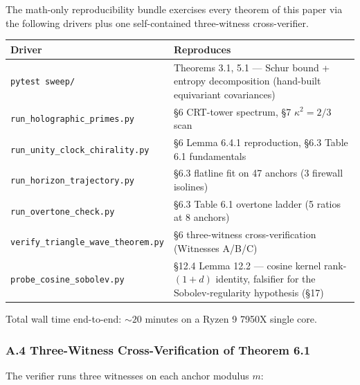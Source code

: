 \documentclass[
  11pt,
]{article}
\newcounter{none} %
\begin{document}
The math-only reproducibility bundle exercises every theorem of this
paper via the following drivers plus one self-contained three-witness
cross-verifier.

{\def\LTcaptype{none} %
\begin{longtable}[]{@{}
  >{\raggedright\arraybackslash}p{}
  >{\raggedright\arraybackslash}p{}@{}}
\toprule\noalign{}
\begin{minipage}[b]{\linewidth}\raggedright
Driver
\end{minipage} & \begin{minipage}[b]{\linewidth}\raggedright
Reproduces
\end{minipage} \\
\midrule\noalign{}
\endhead
\bottomrule\noalign{}
\endlastfoot
\texttt{pytest\ sweep/} & Theorems 3.1, 5.1 --- Schur bound + entropy
decomposition (hand-built equivariant covariances) \\
\texttt{run\_holographic\_primes.py} & §6 CRT-tower spectrum, §7
\(\kappa^2 = 2/3\) scan \\
\texttt{run\_unity\_clock\_chirality.py} & §6 Lemma 6.4.1 reproduction,
§6.3 Table 6.1 fundamentals \\
\texttt{run\_horizon\_trajectory.py} & §6.3 flatline fit on 47 anchors
(3 firewall isolines) \\
\texttt{run\_overtone\_check.py} & §6.3 Table 6.1 overtone ladder (5
ratios at 8 anchors) \\
\texttt{verify\_triangle\_wave\_theorem.py} & §6 three-witness
cross-verification (Witnesses A/B/C) \\
\texttt{probe\_cosine\_sobolev.py} & §12.4 Lemma 12.2 --- cosine kernel
rank-\((1+d)\) identity, falsifier for the Sobolev-regularity hypothesis
(§17) \\
\end{longtable}
}

Total wall time end-to-end: \(\sim 20\) minutes on a Ryzen 9 7950X
single core.

\subsubsection{A.4 Three-Witness Cross-Verification of Theorem
6.1}\label{a.4-three-witness-cross-verification-of-theorem-6.1}

The verifier runs three witnesses on each anchor modulus \(m\):
\end{document}

